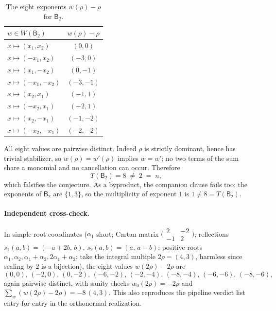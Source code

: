 \documentclass[11pt]{article}
\newcommand{\BB}{\mathsf{B}}
\newcommand{\WW}{W}
\begin{document}
\begin{table}[h]
\centering
\begin{tabular}{lc}
\toprule
$w\in\WW(\BB_2)$ & $w(\rho)-\rho$ \\
\midrule
$x\mapsto(x_1,x_2)$            & $(0,0)$   \\
$x\mapsto(-x_1,x_2)$           & $(-3,0)$  \\
$x\mapsto(x_1,-x_2)$           & $(0,-1)$  \\
$x\mapsto(-x_1,-x_2)$          & $(-3,-1)$ \\
$x\mapsto(x_2,x_1)$            & $(-1,1)$  \\
$x\mapsto(-x_2,x_1)$           & $(-2,1)$  \\
$x\mapsto(x_2,-x_1)$           & $(-1,-2)$ \\
$x\mapsto(-x_2,-x_1)$          & $(-2,-2)$ \\
\bottomrule
\end{tabular}
\caption{The eight exponents $w(\rho)-\rho$ for $\BB_2$.}
\end{table}

All eight values are pairwise distinct. Indeed $\rho$ is strictly dominant,
hence has trivial stabilizer, so $w(\rho)=w'(\rho)$ implies $w=w'$; no two
terms of the sum share a monomial and no cancellation can occur. Therefore
\[
T(\BB_2)=8\;\neq\;2\;=\;n,
\]
which falsifies the conjecture. As a byproduct, the companion clause fails
too: the exponents of $\BB_2$ are $\{1,3\}$, so the multiplicity of exponent
$1$ is $1\neq 8=T(\BB_2)$.

\paragraph{Independent cross-check.}
In simple-root coordinates ($\alpha_1$ short; Cartan matrix
$\bigl(\begin{smallmatrix}2&-2\\-1&2\end{smallmatrix}\bigr)$; reflections
$s_1(a,b)=(-a+2b,\,b)$, $s_2(a,b)=(a,\,a-b)$; positive roots
$\alpha_1,\alpha_2,\alpha_1{+}\alpha_2,2\alpha_1{+}\alpha_2$; take the
integral multiple $2\rho=(4,3)$, harmless since scaling by $2$ is a
bijection), the eight values $w(2\rho)-2\rho$ are
\[
(0,0),\,(-2,0),\,(0,-2),\,(-6,-2),\,(-2,-4),\,(-8,-4),\,(-6,-6),\,(-8,-6),
\]
again pairwise distinct, with sanity checks $w_0(2\rho)=-2\rho$ and
$\sum_w (w(2\rho)-2\rho) = -8\,(4,3)$. This also reproduces the pipeline
verdict list entry-for-entry in the orthonormal realization.
\end{document}
